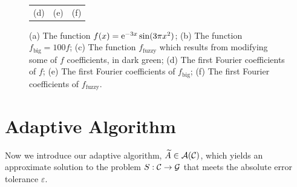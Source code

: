 \documentclass[graybox,footinfo]{svmult}
\begin{document}
\begin{figure}[ht]
\begin{tabular}{c@{\quad}c@{\quad}c}
		\\ (d) & (e) & (f)
	\end{tabular}
	\caption{(a) The function $f(x)={\rm e}^{-3x}\sin(3\pi x^2)$; (b) The function $f_{\text{big}}=100f$; (c) The function $f_{\text{fuzzy}}$ which results from modifying some of $f$ coefficients, in dark green; (d) The first Fourier coefficients of $f$; (e) The first Fourier coefficients of $f_{\text{big}}$; (f) The first Fourier coefficients of $f_{\text{fuzzy}}$. \label{fig:fourier_example}}
\end{figure}

\section{Adaptive Algorithm} \label{sec:adaptalgo}

Now we introduce our adaptive algorithm, $\widetilde{A} \in {\mathcal{A}}({\mathcal{C}})$, which yields an approximate solution to the problem $S:{\mathcal{C}}\rightarrow{\mathcal{G}}$ that meets the absolute error tolerance $\varepsilon$.
\end{document}
